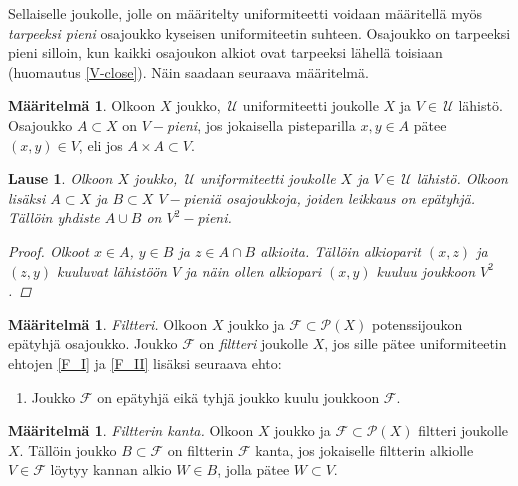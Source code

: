 \documentclass[12pt,a4paper,leqno]{report}
\newcommand{\U}{\,\mathcal{U}}
\newcommand{\Pot}{\mathcal{P}}
\newcommand{\F}{\mathcal{F}}
\theoremstyle{plain}
\newtheorem{lause}[equation]{Lause}
\theoremstyle{definition}
\newtheorem{maar}[equation]{Määritelmä}
\theoremstyle{remark}
\begin{document}
Sellaiselle joukolle, jolle on määritelty uniformiteetti voidaan määritellä myös 
\emph{tarpeeksi pieni} osa\-jouk\-ko kyseisen uniformiteetin suhteen. 
Osajoukko on tarpeeksi pieni silloin, kun kaikki osajoukon alkiot ovat 
tarpeeksi lähellä toisiaan (huomautus \ref{V-close}). 
Näin saadaan seuraava määritelmä.
\begin{maar}
Olkoon $X$ joukko, $\U$ uniformiteetti joukolle $X$ ja $V\in\U$ lähistö. 
Osajoukko $A\subset X$ on \emph{$V-$pieni}, jos 
jokaisella pisteparilla $x,y\in A$ pätee $(x,y)\in V$, eli jos $A\times A\subset V$.
\end{maar}
\begin{lause}
Olkoon $X$ joukko, $\U$ uniformiteetti joukolle $X$ ja $V\in\U$ lähistö. 
Olkoon lisäksi $A\subset X$ ja $B\subset X$ $V-$pieniä osajoukkoja, 
joiden leikkaus on epätyhjä. 
Tällöin yhdiste $A\cup B$ on $V^2-$pieni.
\begin{proof}
Olkoot $x\in A$, $y\in B$ ja $z\in A\cap B$ alkioita. 
Tällöin alkioparit $(x,z)$ ja $(z,y)$ kuuluvat lähistöön $V$ 
ja näin ollen alkiopari $(x,y)$ kuuluu joukkoon $V^2$.
\end{proof}
\end{lause}
\begin{maar}\label{filtteri_maar}
\emph{Filtteri.} Olkoon $X$ joukko ja $\F\subset \Pot(X)$ potenssijoukon epätyhjä osa\-joukko. 
Joukko $\F$ on \emph{filtteri} joukolle $X$, jos sille pätee 
uniformiteetin ehtojen \ref{F_I} ja \ref{F_II} lisäksi 
seuraava ehto:
\begin{enumerate} [label=(F),ref=(F)]
\item\label{filtteriehto} Joukko $\F$ on epätyhjä eikä tyhjä joukko kuulu joukkoon $\F$.
\end{enumerate} 
\end{maar}
\begin{maar}
\emph{Filtterin kanta.} 
Olkoon $X$ joukko ja $\F\subset \Pot(X)$ filtteri joukolle $X$. 
Tällöin joukko $B\subset \F$ on filtterin $\F$ kanta, 
jos jokaiselle filtterin alkiolle $V\in \F$ 
löytyy kannan alkio $W\in B $, jolla pätee $W\subset V$.
\end{maar}
\end{document}
